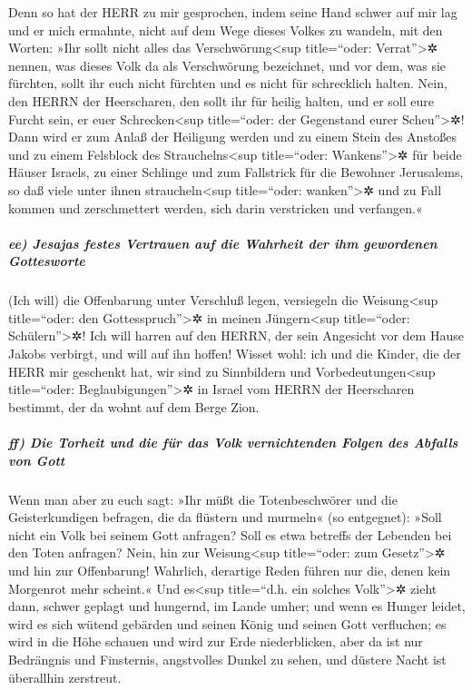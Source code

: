 Denn so hat der HERR zu mir gesprochen, indem seine Hand
schwer auf mir lag und er mich ermahnte, nicht auf dem Wege dieses
Volkes zu wandeln, mit den Worten: »Ihr sollt nicht alles
das Verschwörung\textless sup title=``oder: Verrat''\textgreater✲
nennen, was dieses Volk da als Verschwörung bezeichnet, und vor dem, was
sie fürchten, sollt ihr euch nicht fürchten und es nicht für schrecklich
halten. Nein, den HERRN der Heerscharen, den sollt ihr
für heilig halten, und er soll eure Furcht sein, er euer
Schrecken\textless sup title=``oder: der Gegenstand eurer
Scheu''\textgreater✲! Dann wird er zum Anlaß der
Heiligung werden und zu einem Stein des Anstoßes und zu einem Felsblock
des Strauchelns\textless sup title=``oder: Wankens''\textgreater✲ für
beide Häuser Israels, zu einer Schlinge und zum Fallstrick für die
Bewohner Jerusalems, so daß viele unter ihnen
straucheln\textless sup title=``oder: wanken''\textgreater✲ und zu Fall
kommen und zerschmettert werden, sich darin verstricken und verfangen.«

\hypertarget{ee-jesajas-festes-vertrauen-auf-die-wahrheit-der-ihm-gewordenen-gottesworte}{%
\subparagraph{ee) Jesajas festes Vertrauen auf die Wahrheit der ihm
gewordenen
Gottesworte}\label{ee-jesajas-festes-vertrauen-auf-die-wahrheit-der-ihm-gewordenen-gottesworte}}

(Ich will) die Offenbarung unter Verschluß legen,
versiegeln die Weisung\textless sup title=``oder: den
Gottesspruch''\textgreater✲ in meinen Jüngern\textless sup title=``oder:
Schülern''\textgreater✲! Ich will harren auf den HERRN,
der sein Angesicht vor dem Hause Jakobs verbirgt, und will auf ihn
hoffen! Wisset wohl: ich und die Kinder, die der HERR mir
geschenkt hat, wir sind zu Sinnbildern und Vorbedeutungen\textless sup
title=``oder: Beglaubigungen''\textgreater✲ in Israel vom HERRN der
Heerscharen bestimmt, der da wohnt auf dem Berge Zion.

\hypertarget{ff-die-torheit-und-die-fuxfcr-das-volk-vernichtenden-folgen-des-abfalls-von-gott}{%
\subparagraph{ff) Die Torheit und die für das Volk vernichtenden Folgen
des Abfalls von
Gott}\label{ff-die-torheit-und-die-fuxfcr-das-volk-vernichtenden-folgen-des-abfalls-von-gott}}

Wenn man aber zu euch sagt: »Ihr müßt die Totenbeschwörer
und die Geisterkundigen befragen, die da flüstern und murmeln« (so
entgegnet): »Soll nicht ein Volk bei seinem Gott anfragen? Soll es etwa
betreffs der Lebenden bei den Toten anfragen? Nein, hin
zur Weisung\textless sup title=``oder: zum Gesetz''\textgreater✲ und hin
zur Offenbarung! Wahrlich, derartige Reden führen nur die, denen kein
Morgenrot mehr scheint.« Und es\textless sup title=``d.h.
ein solches Volk''\textgreater✲ zieht dann, schwer geplagt und hungernd,
im Lande umher; und wenn es Hunger leidet, wird es sich wütend gebärden
und seinen König und seinen Gott verfluchen; es wird in
die Höhe schauen und wird zur Erde niederblicken, aber da ist nur
Bedrängnis und Finsternis, angstvolles Dunkel zu sehen, und düstere
Nacht ist überallhin zerstreut.

